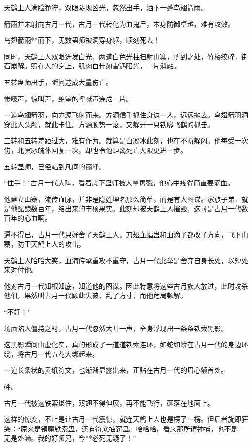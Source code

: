 
\begin{this_body}

天鹤上人满脸狰狞，双眼陡现凶光，忽然出手，洒下一蓬鸟翅箭雨。

箭雨并未射向古月一代，古月一代转化为血鬼尸，本身防御卓越，难有攻效。

鸟翅箭雨**而下，无数蛊师被洞穿身躯，顷刻死去！

同时，天鹤上人双眼迸发白光，两道白色光柱扫射山寨，所到之处，竹楼绞碎，街石崩解。照在人的身上，肌肉白骨如雪遇阳光，一片消融。

五转蛊师出手，瞬间造成大量伤亡。

惨嚎声，惊叫声，绝望的呼喊声连成一片。

一道鸟翅箭羽，向方源飞射而来。方源信手抓住身边一人，远远抛去。鸟翅箭羽洞穿此人头颅，就此卡住。方源顺势一滚，又躲开一只铁喙飞鹤的抓击。

三转和五转差距过大，难有作为。就算是白凝冰此刻，也在不断躲闪。他每受一次伤，北冥冰魄体回复一次，却也令他距离死亡大限更进一步。

五转蛊师，已经站到凡间的巅峰。

“住手！”古月一代大叫，看着底下蛊师被大量屠戮，他心中疼得简直要滴血。

他建立山寨，流传血脉，并非是隐姓埋名那么简单，而是有大图谋。家族子弟，就是他酝酿数百年，结出来的丰硕果实。此刻却被天鹤上人摧毁，这可是古月一代数百年的心血啊。

逼不得已，古月一代只好舍了天鹤上人，刀翅血蝠蛊和血滴子都改了方向，飞下山寨，防卫天鹤上人的攻击。

天鹤上人哈哈大笑，血海传承重攻不重守，古月一代此举是舍弃自身长处，以短处来对付他。

他对古月一代知根知底，知道他的图谋。因此特意将这些古月族人放过，此时攻杀他们，果然叫古月一代顾此失彼，乱了方寸，而他危局顿解。

“不好！”

场面陷入僵持之时，古月一代忽然大叫一声，全身浮现出一条条铁索黑影。

这黑影瞬间由虚化实，真的形成了一道道铁索连环，如蛇如蟒在古月一代的身边环绕，将古月一代五花大绑起来。

一道长条状的黄纸符文，也渐渐显露出来，正贴在古月一代的眉心额首处。

砰。

古月一代被这铁索绑住，双翅不得伸展，再不能飞行，砸落在地面上。

这样的惊变，不止是让古月一代震惊，就连天鹤上人也是楞了一楞。但后者旋即狂笑：“原来是镇魔铁索蛊，还有符底抽薪蛊。哈哈哈，看来那所谓神捕，也不是一无是处嘛。我的好师兄，今**必死无疑了！”


\end{this_body}
